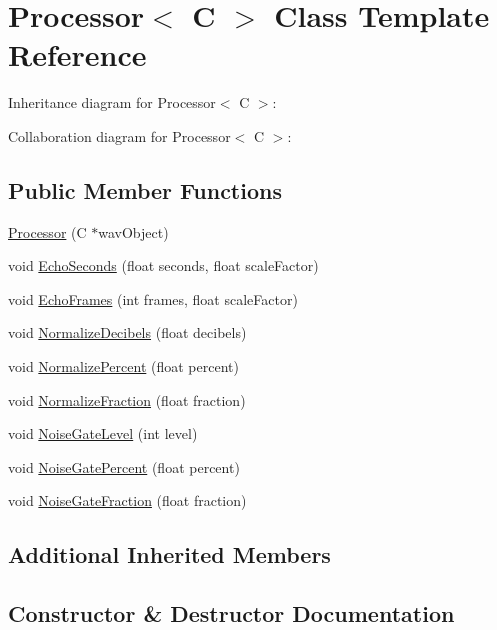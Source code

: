 \hypertarget{classProcessor}{}\section{Processor$<$ C $>$ Class Template Reference}
\label{classProcessor}


Inheritance diagram for Processor$<$ C $>$\+:


Collaboration diagram for Processor$<$ C $>$\+:
\subsection*{Public Member Functions}
\begin{DoxyCompactItemize}
\item 
\hyperlink{classProcessor_ac27e9474257b55661fa221497f1f82fb}{Processor} (C $\ast$wav\+Object)
\item 
void \hyperlink{classProcessor_a78eddf7400dbb916dd1a2f86604c61c8}{Echo\+Seconds} (float seconds, float scale\+Factor)
\item 
void \hyperlink{classProcessor_a351348e5bea46d7b01f2678f638918de}{Echo\+Frames} (int frames, float scale\+Factor)
\item 
void \hyperlink{classProcessor_a1125ca6169f0d51516c9479e275d7caa}{Normalize\+Decibels} (float decibels)
\item 
void \hyperlink{classProcessor_a1f5e551c8a57d91bbc1b8f69ab51e590}{Normalize\+Percent} (float percent)
\item 
void \hyperlink{classProcessor_accb48e4f7a49d5804dac5438896a5b92}{Normalize\+Fraction} (float fraction)
\item 
void \hyperlink{classProcessor_a21406185912e85d6d43657257c4095c0}{Noise\+Gate\+Level} (int level)
\item 
void \hyperlink{classProcessor_a357a5600fe3ecdfe1b9da4cc2afc6cf1}{Noise\+Gate\+Percent} (float percent)
\item 
void \hyperlink{classProcessor_a8762bfcd807bfd8242e8398e0541508c}{Noise\+Gate\+Fraction} (float fraction)
\end{DoxyCompactItemize}
\subsection*{Additional Inherited Members}


\subsection{Constructor \& Destructor Documentation}
\mbox{\label{classProcessor_ac27e9474257b55661fa221497f1f82fb}} 
